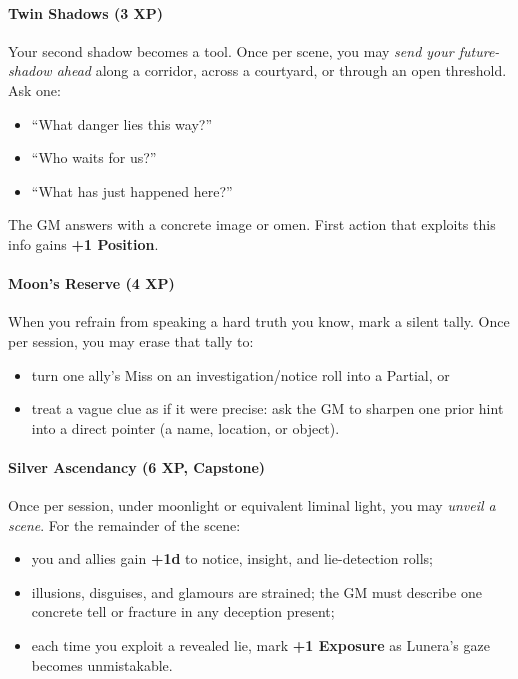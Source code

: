 \documentclass[11pt]{book}
\begin{document}
\paragraph{Twin Shadows (3 XP)}
Your second shadow becomes a tool. Once per scene, you may \emph{send your future-shadow ahead} along a corridor, across a courtyard, or through an open threshold. Ask one:
\begin{itemize}[leftmargin=*]
  \item ``What danger lies this way?''
  \item ``Who waits for us?''
  \item ``What has just happened here?''
\end{itemize}
The GM answers with a concrete image or omen. First action that exploits this info gains \textbf{+1 Position}.

\paragraph{Moon's Reserve (4 XP)}
When you refrain from speaking a hard truth you know, mark a silent tally. Once per session, you may erase that tally to:
\begin{itemize}[leftmargin=*]
  \item turn one ally's Miss on an investigation/notice roll into a Partial, or
  \item treat a vague clue as if it were precise: ask the GM to sharpen one prior hint into a direct pointer (a name, location, or object).
\end{itemize}

\paragraph{Silver Ascendancy (6 XP, Capstone)}
Once per session, under moonlight or equivalent liminal light, you may \emph{unveil a scene}. For the remainder of the scene:
\begin{itemize}[leftmargin=*]
  \item you and allies gain \textbf{+1d} to notice, insight, and lie-detection rolls;
  \item illusions, disguises, and glamours are strained; the GM must describe one concrete tell or fracture in any deception present;
  \item each time you exploit a revealed lie, mark \textbf{+1 Exposure} as Lunera's gaze becomes unmistakable.
\end{itemize}
\end{document}
